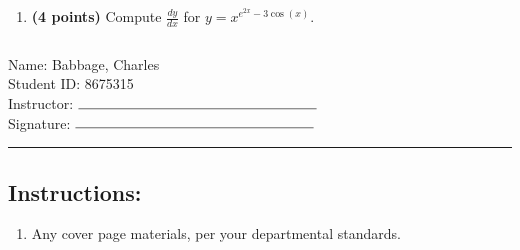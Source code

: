 \documentclass[12pt]{amsart}
\begin{document}
\begin{enumerate}
\vfill 
\def \varexp{2}\def \newexp{1}\def \trigcoeff{-3}\def \trigval{-3}\def \oppval{+3}
\item {\bf (4 points)} 
 Compute $\frac{dy}{dx}$ for $y=x^{e^{\varexp x} \trigval \cos(x)}$.

\vfill 
\newpage  $ $   \newpage\end{enumerate}\graphicspath{{C:/Users/iainc/anaconda3/Randomizer/MATH 1001/Midterm 1/}}\setcounter{page}{1}


\thispagestyle{fancy}

 \noindent Name: Babbage, Charles \vspace{.3cm} \\\noindent Student ID: 8675315 \vspace{.3cm} \\\noindent Instructor: $\rule{6cm}{0.15mm}$ \vspace{.3cm} \\\noindent Signature: $\rule{6cm}{0.15mm}$ \vspace{.3cm} \\ 



\vspace{.4cm}


\vspace{.4cm}

\hrule

\subsection*{Instructions:} \begin{enumerate}[1.]
\item Any cover page materials, per your departmental standards.
\end{enumerate}
\end{document}
